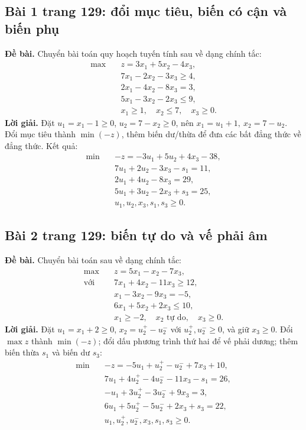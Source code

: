 \documentclass[11pt,a4paper]{article}
\begin{document}
\subsection{Bài 1 trang 129: đổi mục tiêu, biến có cận và biến phụ}
\textbf{Đề bài.} Chuyển bài toán quy hoạch tuyến tính sau về dạng chính tắc:
\[
\begin{aligned}
\max\quad &z=3x_1+5x_2-4x_3,\\
&7x_1-2x_2-3x_3\ge4,\\
&2x_1-4x_2-8x_3=3,\\
&5x_1-3x_2-2x_3\le9,\\
&x_1\ge1,\quad x_2\le7,\quad x_3\ge0.
\end{aligned}
\]
\textbf{Lời giải.} Đặt \(u_1=x_1-1\ge0\), \(u_2=7-x_2\ge0\), nên \(x_1=u_1+1,\ x_2=7-u_2\). Đổi mục tiêu thành \(\min(-z)\), thêm biến dư/thừa để đưa các bất đẳng thức về đẳng thức. Kết quả:
\[
\begin{aligned}
\min\quad&-z=-3u_1+5u_2+4x_3-38,\\
&7u_1+2u_2-3x_3-s_1=11,\\
&2u_1+4u_2-8x_3=29,\\
&5u_1+3u_2-2x_3+s_3=25,\\
&u_1,u_2,x_3,s_1,s_3\ge0.
\end{aligned}
\]

\subsection{Bài 2 trang 129: biến tự do và vế phải âm}
\textbf{Đề bài.} Chuyển bài toán sau về dạng chính tắc:
\[
\begin{aligned}
\max\quad &z=5x_1-x_2-7x_3,\\
\text{với}\quad
&7x_1+4x_2-11x_3\ge12,\\
&x_1-3x_2-9x_3=-5,\\
&6x_1+5x_2+2x_3\le10,\\
&x_1\ge-2,\quad x_2\text{ tự do},\quad x_3\ge0.
\end{aligned}
\]
\textbf{Lời giải.} Đặt \(u_1=x_1+2\ge0\), \(x_2=u_2^+-u_2^-\) với \(u_2^+,u_2^-\ge0\), và giữ \(x_3\ge0\). Đổi \(\max z\) thành \(\min(-z)\); đổi dấu phương trình thứ hai để vế phải dương; thêm biến thừa \(s_1\) và biến dư \(s_3\):
\[
\begin{aligned}
\min\quad&-z=-5u_1+u_2^+-u_2^-+7x_3+10,\\
&7u_1+4u_2^+-4u_2^--11x_3-s_1=26,\\
&-u_1+3u_2^+-3u_2^-+9x_3=3,\\
&6u_1+5u_2^+-5u_2^-+2x_3+s_3=22,\\
&u_1,u_2^+,u_2^-,x_3,s_1,s_3\ge0.
\end{aligned}
\]
\end{document}
